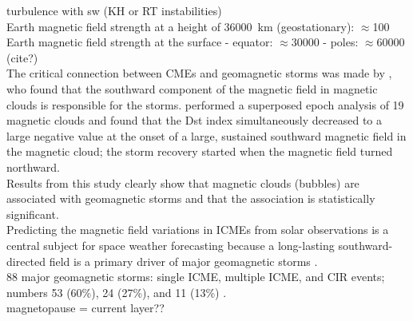 turbulence with sw (KH or RT instabilities)\\

Earth magnetic field strength at a height of \SI{36000}{\km} (geostationary): $\approx$\SI{100}{\nT}\\
Earth magnetic field strength at the surface - equator: $\approx$\SI{30000}{\nT} - poles: $\approx$\SI{60000}{\nT} (cite?)\\


The critical connection between CMEs and geomagnetic storms was made by \citet{Wilson1987}, who found that the southward component of the magnetic field in magnetic clouds is responsible for the storms. \citet{Wilson1987} performed a superposed epoch analysis of 19 magnetic clouds and found that the Dst index simultaneously decreased to a large negative value at the onset of a large, sustained southward magnetic field in the magnetic cloud; the storm recovery started when the magnetic field turned northward.\\
Results from this study clearly show that magnetic clouds (bubbles) are associated with geomagnetic storms and that the association is statistically significant. \citet{Wilson1987}\\

Predicting the magnetic field variations in ICMEs from solar observations is a central subject for space weather forecasting because a long-lasting southward-directed  field is a primary driver of major geomagnetic storms \citep{Zhang2007}.\\
88 major geomagnetic storms: single ICME, multiple ICME, and CIR events; numbers 53 (60\%), 24 (27\%), and 11 (13\%) \citep{Zhang2007}.\\


magnetopause = current layer??\\

